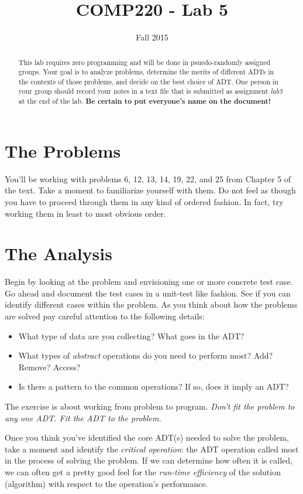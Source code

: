 \documentclass[10pt]{article}
\title{COMP220 - Lab 5}
\author{ }
\date{Fall 2015}
\begin{document}
\maketitle

\begin{abstract}
This lab requires zero programming and will be done in psuedo-randomly assigned groups. Your goal is to analyze problems, determine the merits of different ADTs in the contexts of those problems, and decide on the best choice of ADT. One person in your group should record your notes in a text file that is submitted as assignment \textit{lab5} at the end of the lab. \textbf{Be certain to put everyone's name on the document!}
\end{abstract}


\section{The Problems}

You'll be working with problems 6, 12, 13, 14, 19, 22, and 25 from Chapter 5 of the text. Take a moment to familiarize yourself with them. Do not feel as though you have to proceed through them in any kind of ordered fashion. In fact, try working them in least to most obvious order. 

\section{The Analysis}

Begin by looking at the problem and envisioning one or more concrete test case. Go ahead and document the test cases in a unit-test like fashion. See if you can identify different cases within the problem. As you think about how the problems are solved pay careful attention to the following details:
\begin{itemize}
\item What type of data are you collecting? What goes in the ADT? 
\item What types of \textit{abstract} operations do you need to perform most? Add? Remove? Access? 
\item Is there a pattern to the common operations? If so, does it imply an ADT? 
\end{itemize}
The exercise is about working from problem to program. \textit{Don't fit the problem to any one ADT. Fit the ADT to the problem.}

Once you think you've identified the core ADT(s) needed to solve the problem, take a moment and identify the \textit{critical operation}: the ADT operation called most in the process of solving the problem. If we can determine how often it is called, we can often get a pretty good feel for the \textit{run-time efficiency} of the solution (algorithm) with respect to the operation's performance. 
\end{document}
